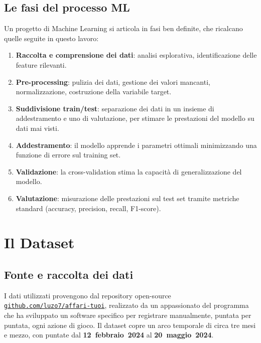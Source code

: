 \documentclass[12pt, a4paper]{article}
\begin{document}
\subsection{Le fasi del processo ML}

Un progetto di Machine Learning si articola in fasi ben definite, che
ricalcano quelle seguite in questo lavoro:

\begin{enumerate}
  \item \textbf{Raccolta e comprensione dei dati}: analisi esplorativa,
        identificazione delle feature rilevanti.
  \item \textbf{Pre-processing}: pulizia dei dati, gestione dei valori mancanti,
        normalizzazione, costruzione della variabile target.
  \item \textbf{Suddivisione train/test}: separazione dei dati in un insieme di
        addestramento e uno di valutazione, per stimare le prestazioni del
        modello su dati mai visti.
  \item \textbf{Addestramento}: il modello apprende i parametri ottimali
        minimizzando una funzione di errore sul training set.
  \item \textbf{Validazione}: la cross-validation stima la capacità di
        generalizzazione del modello.
  \item \textbf{Valutazione}: misurazione delle prestazioni sul test set tramite
        metriche standard (accuracy, precision, recall, F1-score).
\end{enumerate}

\section{Il Dataset}

\subsection{Fonte e raccolta dei dati}

I dati utilizzati provengono dal repository open-source
\href{https://github.com/luzo7/affari-tuoi}{\texttt{github.com/luzo7/affari-tuoi}},
realizzato da un appassionato del programma che ha sviluppato un software
specifico per registrare manualmente, puntata per puntata, ogni azione di gioco.
Il dataset copre un arco temporale di circa tre mesi e mezzo,
con puntate dal \textbf{12~febbraio~2024} al \textbf{20~maggio~2024}.
\end{document}
